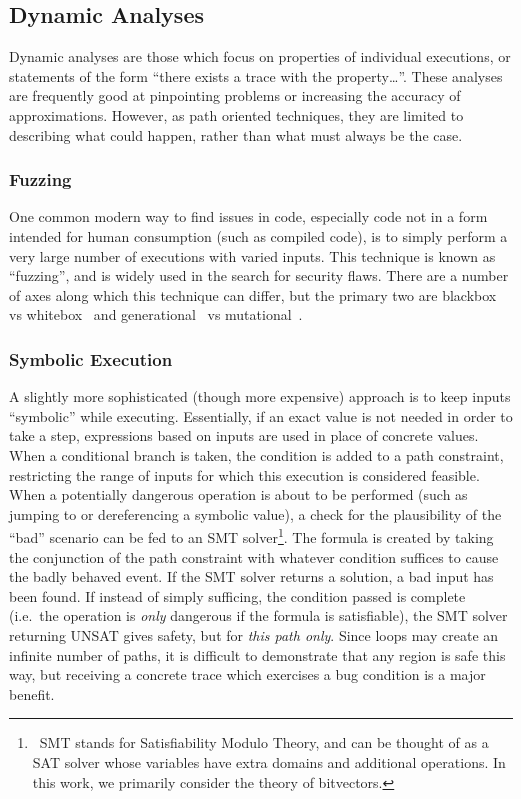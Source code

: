 \subsection{Dynamic Analyses}
Dynamic analyses are those which focus on properties of individual executions, or statements of the form ``there exists a trace with the property\ldots''.
These analyses are frequently good at pinpointing problems or increasing the accuracy of approximations.
However, as path oriented techniques, they are limited to describing what could happen, rather than what must always be the case.

\subsubsection{Fuzzing}
One common modern way to find issues in code, especially code not in a form intended for human consumption (such as compiled code), is to simply perform a very large number of executions with varied inputs.
This technique is known as ``fuzzing'', and is widely used in the search for security flaws.
There are a number of axes along which this technique can differ, but the primary two are blackbox~\cite{peach,zzuf,rebert2014} vs whitebox~\cite{klee,godefroid2008,avgerinos2014} and generational~\cite{peach} vs mutational~\cite{zzuf}.

\subsubsection{Symbolic Execution}
A slightly more sophisticated (though more expensive) approach is to keep inputs ``symbolic'' while executing.
Essentially, if an exact value is not needed in order to take a step, expressions based on inputs are used in place of concrete values.
When a conditional branch is taken, the condition is added to a path constraint, restricting the range of inputs for which this execution is considered feasible.
When a potentially dangerous operation is about to be performed (such as jumping to or dereferencing a symbolic value), a check for the plausibility of the ``bad'' scenario can be fed to an SMT solver\footnote{\
SMT stands for Satisfiability Modulo Theory, and can be thought of as a SAT solver whose variables have extra domains and additional operations. In this work, we primarily consider the theory of bitvectors.
}.
The formula is created by taking the conjunction of the path constraint with whatever condition suffices to cause the badly behaved event.
If the SMT solver returns a solution, a bad input has been found\cite{aeg,mayhem}.
If instead of simply sufficing, the condition passed is complete (i.e.\ the operation is \emph{only} dangerous if the formula is satisfiable), the SMT solver returning UNSAT gives safety, but for \emph{this path only}.
Since loops may create an infinite number of paths, it is difficult to demonstrate that any region is safe this way, but receiving a concrete trace which exercises a bug condition is a major benefit.


